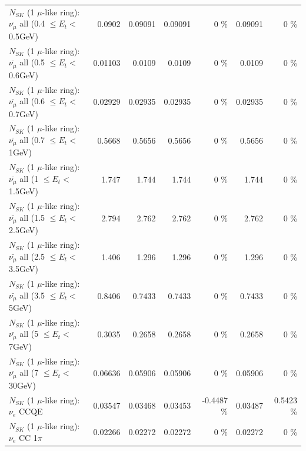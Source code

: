 \begin{table}
\begin{tabular}{| l | r | r | r  r | r  r |}
 $N_{SK}$ (1 $\mu$-like ring): $\bar{\nu_{\mu}}$ all (0.4 $\leq E_{t} <$ 0.5GeV) &          0.0902 &         0.09091 &         0.09091 &        0 \%  &         0.09091 &        0 \%  \\ 
 $N_{SK}$ (1 $\mu$-like ring): $\bar{\nu_{\mu}}$ all (0.5 $\leq E_{t} <$ 0.6GeV) &         0.01103 &          0.0109 &          0.0109 &        0 \%  &          0.0109 &        0 \%  \\ 
 $N_{SK}$ (1 $\mu$-like ring): $\bar{\nu_{\mu}}$ all (0.6 $\leq E_{t} <$ 0.7GeV) &         0.02929 &         0.02935 &         0.02935 &        0 \%  &         0.02935 &        0 \%  \\ 
   $N_{SK}$ (1 $\mu$-like ring): $\bar{\nu_{\mu}}$ all (0.7 $\leq E_{t} <$ 1GeV) &          0.5668 &          0.5656 &          0.5656 &        0 \%  &          0.5656 &        0 \%  \\ 
   $N_{SK}$ (1 $\mu$-like ring): $\bar{\nu_{\mu}}$ all (1 $\leq E_{t} <$ 1.5GeV) &           1.747 &           1.744 &           1.744 &        0 \%  &           1.744 &        0 \%  \\ 
 $N_{SK}$ (1 $\mu$-like ring): $\bar{\nu_{\mu}}$ all (1.5 $\leq E_{t} <$ 2.5GeV) &           2.794 &           2.762 &           2.762 &        0 \%  &           2.762 &        0 \%  \\ 
 $N_{SK}$ (1 $\mu$-like ring): $\bar{\nu_{\mu}}$ all (2.5 $\leq E_{t} <$ 3.5GeV) &           1.406 &           1.296 &           1.296 &        0 \%  &           1.296 &        0 \%  \\ 
   $N_{SK}$ (1 $\mu$-like ring): $\bar{\nu_{\mu}}$ all (3.5 $\leq E_{t} <$ 5GeV) &          0.8406 &          0.7433 &          0.7433 &        0 \%  &          0.7433 &        0 \%  \\ 
     $N_{SK}$ (1 $\mu$-like ring): $\bar{\nu_{\mu}}$ all (5 $\leq E_{t} <$ 7GeV) &          0.3035 &          0.2658 &          0.2658 &        0 \%  &          0.2658 &        0 \%  \\ 
    $N_{SK}$ (1 $\mu$-like ring): $\bar{\nu_{\mu}}$ all (7 $\leq E_{t} <$ 30GeV) &         0.06636 &         0.05906 &         0.05906 &        0 \%  &         0.05906 &        0 \%  \\ 
\hline
\hline
\hline
                                      $N_{SK}$ (1 $\mu$-like ring): $\nu_e$ CCQE &         0.03547 &         0.03468 &         0.03453 &  -0.4487 \%  &         0.03487 &   0.5423 \%  \\ 
                                 $N_{SK}$ (1 $\mu$-like ring): $\nu_e$ CC 1$\pi$ &         0.02266 &         0.02272 &         0.02272 &        0 \%  &         0.02272 &        0 \%  \\ 

\end{tabular}
\end{table}
